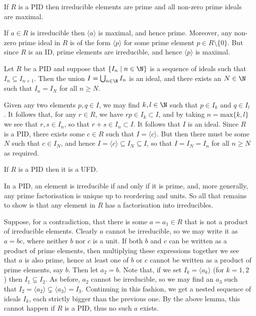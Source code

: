 \documentclass{maths}
\begin{document}
\begin{lem}
    If $R$ is a PID then irreducible elements are prime and all non-zero prime ideals are maximal.
\end{lem}

\begin{prf}
    If $a\in R$ is irreducible then $\langle a\rangle$ is maximal, and hence prime.
    Moreover, any non-zero prime ideal in $R$ is of the form $\langle p\rangle$ for some prime element $p\in R\setminus\{0\}$.
    But since $R$ is an ID, prime elements are irreducible, and hence $\langle p\rangle$ is maximal.
\end{prf}

\begin{lem}
    Let $R$ be a PID and suppose that $\{I_n \mid n\in\N\}$ is a sequence of ideals such that $I_n\subseteq I_{n+1}$.
    Then the union $I=\bigcup_{n\in\N}I_n$ is an ideal, and there exists an $N\in\N$ such that $I_n=I_N$ for all $n\geqslant N$.
\end{lem}

\begin{prf}
    Given any two elements $p,q\in I$, we may find $k,l\in\N$ such that $p\in I_k$ and $q\in I_l$.
    It follows that, for any $r\in R$, we have $rp\in I_k\subset I$, and by taking $n=\mathrm{max}\{k,l\}$ we see that $r,s\in I_n$, so that $r+s\in I_n\subset I$.
    It follows that $I$ is an ideal.
    Since $R$ is a PID, there exists some $c\in R$ such that $I=\langle c\rangle$.
    But then there must be some $N$ such that $c\in I_N$, and hence $I=\langle c\rangle\subseteq I_N\subseteq I$, so that $I=I_N=I_n$ for all $n\geqslant N$ as required.
\end{prf}

\begin{lem}
    If $R$ is a PID then it is a UFD.
\end{lem}

\begin{prf}
    In a PID, an element is irreducible if and only if it is prime, and, more generally, any prime factorisation is unique up to reordering and units.
    So all that remains to show is that any element in $R$ has a factorisation into irreducibles.

    Suppose, for a contradiction, that there is some $a=a_1\in R$ that is not a product of irreducible elements.
    Clearly $a$ cannot be irreducible, so we may write it as $a=bc$, where neither $b$ nor $c$ is a unit.
    If both $b$ and $c$ can be written as a product of prime elements, then multiplying these expressions together we see that $a$ is also prime, hence at least one of $b$ or $c$ cannot be written as a product of prime elements, say $b$.
    Then let $a_2=b$.
    Note that, if we set $I_k=\langle a_k\rangle$ (for $k=1,2$) then $I_1\subsetneq I_2$.
    As before, $a_2$ cannot be irreducible, so we may find an $a_3$ such that $I_2=\langle a_2\rangle\subsetneq\langle a_3\rangle=I_3$.
    Continuing in this fashion, we get a nested sequence of ideals $I_k$, each strictly bigger than the previous one.
    By the above lemma, this cannot happen if $R$ is a PID, thus no such $a$ exists.
\end{prf}
\end{document}
